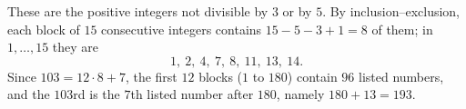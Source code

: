 These are the positive integers not divisible by $3$ or by $5$. By inclusion--exclusion, each block of $15$ consecutive integers contains $15-5-3+1=8$ of them; in $1,\dots,15$ they are
\[1,\ 2,\ 4,\ 7,\ 8,\ 11,\ 13,\ 14.\]
Since $103=12\cdot8+7$, the first $12$ blocks ($1$ to $180$) contain $96$ listed numbers, and the $103$rd is the $7$th listed number after $180$, namely $180+13=\boxed{193}$.

